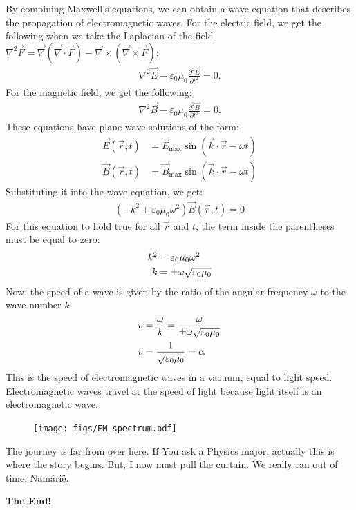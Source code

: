 \documentclass[12pt,b4paper]{article}
\begin{document}
By combining Maxwell's equations, we can obtain a wave equation that describes the propagation of electromagnetic waves. For the electric field, we get the following when we take the Laplacian of the field $\displaystyle\nabla^2\vec{F}=\vec{\nabla}\left(\vec{\nabla}\cdot\vec{F}\right)-\vec{\nabla}\times\left(\vec{\nabla}\times\vec{F}\right)$:
\begin{align}
    \nabla^2\vec{E}-\varepsilon_0\mu_0\frac{\partial^2 \vec{E}}{\partial t^2}=0.\label{electric-field-wave-equation}
\end{align}
For the magnetic field, we get the following:
\begin{align}
    \nabla^2\vec{B}-\varepsilon_0\mu_0\frac{\partial^2 \vec{B}}{\partial t^2}=0.
\end{align}
These equations have plane wave solutions of the form:
\begin{align}
    \vec{E}(\vec{r},t)&=\vec{E}_\text{max}\sin(\vec{k}\cdot\vec{r}-\omega t)\label{electric-field-solution}\\
    \vec{B}(\vec{r},t)&=\vec{B}_\text{max}\sin(\vec{k}\cdot\vec{r}-\omega t)\label{magnetic-field-solution}
\end{align}
Substituting it into the wave equation, we get:
\begin{align}
    (-k^2+\varepsilon_0\mu_0\omega^2)\vec{E}(\vec{r},t)=0
\end{align}
For this equation to hold true for all $\vec{r}$ and $t$, the term inside the parentheses must be equal to zero:
\begin{align}
    k^2&=\varepsilon_0\mu_0\omega^2\notag\\
    k&=\pm\omega\sqrt{\varepsilon_0\mu_0}
\end{align}
Now, the speed of a wave is given by the ratio of the angular frequency $\omega$ to the wave number $k$:
\begin{align}
    v&=\frac{\omega}{k}=\frac{\omega}{\pm\omega\sqrt{\varepsilon_0\mu_0}}\notag\\
    v&=\frac{1}{\sqrt{\varepsilon_0\mu_0}}=c.
\end{align}
This is the speed of electromagnetic waves in a vacuum, equal to light speed. Electromagnetic waves travel at the speed of light because light itself is an electromagnetic wave.
\begin{figure}[H]
    \centering
    \texttt{[image: figs/EM\_spectrum.pdf]}
    \label{fig:em-spectrum}
\end{figure}
The journey is far from over here. If You ask a Physics major, actually this is where the story begins. But, I now must pull the curtain. We really ran out of time. Namárië.
\vspace{1in}
\begin{center}
    \Large \textbf{The End!}
\end{center}
\end{document}
